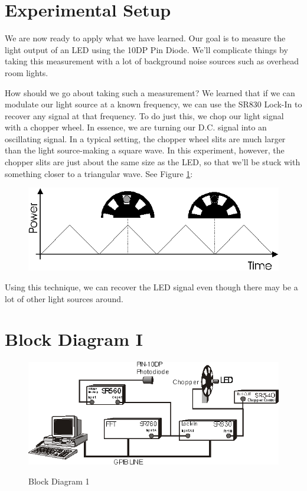 \documentclass{../lab}
\begin{document}
\section{Experimental Setup}

We are now ready to apply what we have learned. Our goal is to measure the light output of an LED using the 10DP Pin Diode. We'll complicate things by taking this measurement with a lot of background noise sources such as overhead room lights.

How should we go about taking such a measurement? We learned that if we can modulate our light source at a known frequency, we can use the SR830 Lock-In to recover any signal at that frequency. To do just this, we chop our light signal with a chopper wheel. In essence, we are turning our D.C. signal into an oscillating signal. In a typical setting, the chopper wheel slits are much larger than the light source-making a square wave. In this experiment, however, the chopper slits are just about the same size as the LED, so that we'll be stuck with something closer to a triangular wave. See Figure \ref{fig:PowerVsTime}:

\begin{figure}[h]
    \centering
    \href{http://experimentationlab.berkeley.edu/sites/default/files/images/LLSimage044.gif}{\includegraphics[width=0.5\linewidth]{images/LLSimage044.png}}
    \caption{}
    \label{fig:PowerVsTime}
\end{figure}

\noindent Using this technique, we can recover the LED signal even though there may be a lot of other light sources around.

\section{Block Diagram I}

\begin{figure}[h]
    \centering
    \href{http://experimentationlab.berkeley.edu/sites/default/files/images/LLSimage045.gif}{\includegraphics[width=0.5\linewidth]{images/LLSimage045.png}}
    \caption{Block Diagram 1}
    \label{fig:BlockDiagramI}
\end{figure}
\end{document}
